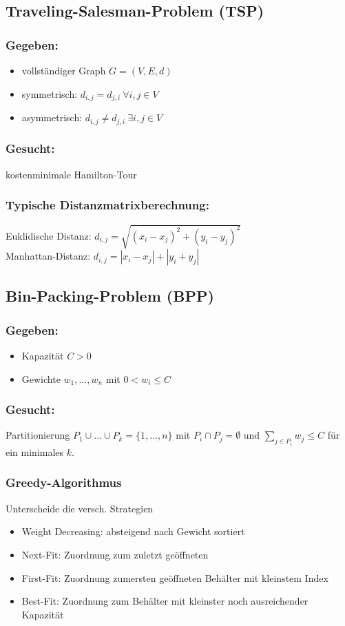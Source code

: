\documentclass[12pt]{article}
\begin{document}
		\subsection{Traveling-Salesman-Problem (TSP)}\label{TSP}
			\subsubsection*{Gegeben:}
			\begin{itemize}
				\item vollständiger Graph $G=(V,E,d)$
				\item symmetrisch: $d_{i,j}=d_{j,i}\> \forall i,j\in V$
				\item asymmetrisch: $d_{i,j}\neq d_{j,i}\> \exists i,j \in V$
			\end{itemize}
			\subsubsection*{Gesucht:}
			kostenminimale Hamilton-Tour
			
			\subsubsection{Typische Distanzmatrixberechnung:}
			Euklidische Distanz: $d_{i,j}=\sqrt{(x_i-x_j)^2+(y_i-y_j)^2}$ \\
			Manhattan-Distanz: $d_{i,j}=|x_i-x_j|+|y_i+y_j|$
		\subsection{Bin-Packing-Problem (BPP)}
			\subsubsection*{Gegeben:}
				\begin{itemize}
					\item Kapazität $C>0$
					\item Gewichte $w_1,\dots,w_n$ mit $0<w_i\le C$
				\end{itemize}
			\subsubsection*{Gesucht:}
				Partitionierung $P_1\cup\dots\cup P_k = \{1,\dots,n\}$ mit $P_i\cap P_j = \emptyset$ und $\sum_{j\in P_i} w_j \le C$ für ein minimales $k$.

			\subsubsection*{Greedy-Algorithmus}\label{BPGreedy}
			Unterscheide die versch. Strategien
			\begin{itemize}
				\item Weight Decreasing: absteigend nach Gewicht sortiert
				\item Next-Fit: Zuordnung zum zuletzt geöffneten
				\item First-Fit: Zuordnung zumersten geöffneten Behälter mit kleinstem Index
				\item Best-Fit: Zuordnung zum Behälter mit kleinster noch ausreichender Kapazität
			\end{itemize}
		
\end{document}
